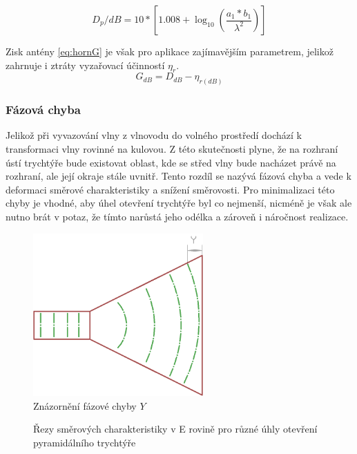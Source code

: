 \begin{equation}
D_p/dB = 10*[1.008+\log_{10}({\frac{a_1 * b_1}{\lambda^2}})]
\label{eq:hornD}
\end{equation}

\renewcommand{\figurename}{Obrázek}
Zisk antény \ref{eq:hornG} je však pro aplikace zajímavějším parametrem, jelikož zahrnuje i ztráty vyzařovací účinností $\eta_r$.
\begin{equation}
G_{dB} = D_{dB} - \eta_{r(dB)}
\label{eq:hornG}
\end{equation}

\subsubsection{Fázová chyba}
Jelikož při vyvazování vlny z vlnovodu do volného prostředí dochází k transformaci vlny rovinné na kulovou. Z této skutečnosti plyne, že na rozhraní ústí trychtýře bude existovat oblast, kde se střed vlny bude nacházet právě na rozhraní, ale její okraje stále uvnitř. Tento rozdíl se nazývá fázová chyba a vede k deformaci směrové charakteristiky a snížení směrovosti. Pro minimalizaci této chyby je vhodné, aby úhel otevření trychtýře byl co nejmenší, nicméně je však ale nutno brát v potaz, že tímto narůstá jeho odélka a zároveň i náročnost realizace.
\begin{figure}[h]
\begin{center}
\includegraphics[width=6.5cm]{pics/hornErr}
\caption{Znázornění fázové chyby $Y$}
\label{fig:HornErr}
\end{center}
\end{figure}

\begin{figure}
\caption{Řezy směrových charakteristiky v E rovině pro různé úhly otevření pyramidálního trychtýře}
\label{fig:HornLenDep}
\end{figure}


